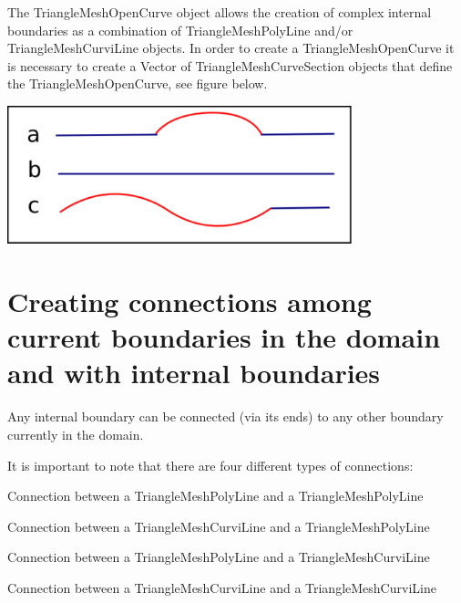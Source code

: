 The {\ttfamily Triangle\+Mesh\+Open\+Curve} object allows the creation of complex internal boundaries as a combination of {\ttfamily Triangle\+Mesh\+Poly\+Line} and/or {\ttfamily Triangle\+Mesh\+Curvi\+Line} objects. In order to create a {\ttfamily Triangle\+Mesh\+Open\+Curve} it is necessary to create a {\ttfamily Vector} of {\ttfamily Triangle\+Mesh\+Curve\+Section} objects that define the {\ttfamily Triangle\+Mesh\+Open\+Curve}, see figure below.

 
\begin{DoxyImage}
\includegraphics[width=0.75\textwidth]{different_open_curves}
\end{DoxyImage}




\hypertarget{index_connections}{}\section{Creating connections among current boundaries in the domain and with internal boundaries}\label{index_connections}
Any internal boundary can be connected (via its ends) to any other boundary currently in the domain.

It is important to note that there are four different types of connections\+:
\begin{DoxyItemize}
\item Connection between a {\ttfamily Triangle\+Mesh\+Poly\+Line} and a {\ttfamily Triangle\+Mesh\+Poly\+Line} 
\item Connection between a {\ttfamily Triangle\+Mesh\+Curvi\+Line} and a {\ttfamily Triangle\+Mesh\+Poly\+Line} 
\item Connection between a {\ttfamily Triangle\+Mesh\+Poly\+Line} and a {\ttfamily Triangle\+Mesh\+Curvi\+Line} 
\item Connection between a {\ttfamily Triangle\+Mesh\+Curvi\+Line} and a {\ttfamily Triangle\+Mesh\+Curvi\+Line} 
\end{DoxyItemize}


